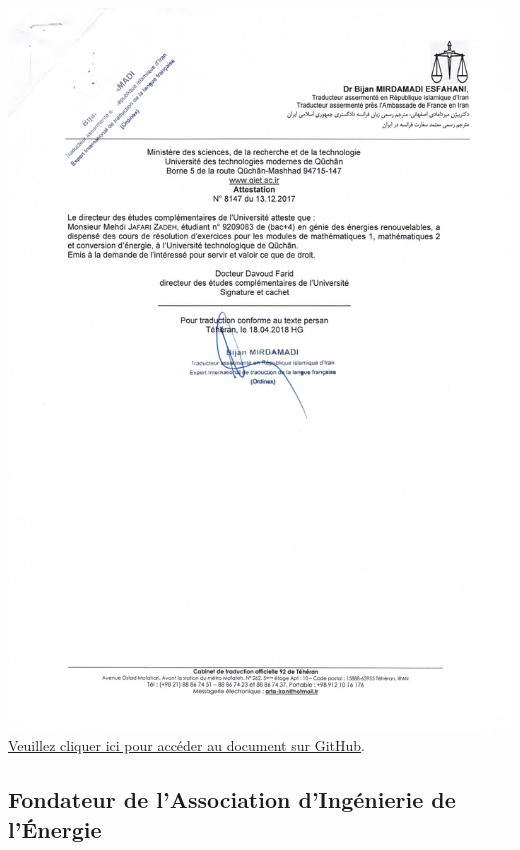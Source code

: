 \documentclass{article}
\begin{document}
        \begin{center}
            \includegraphics[width=\textwidth,height=\textheight,keepaspectratio]{../Document/Work Experience/Teaching Assistant/13-12-2017 attestation.jpg}
            \footnotesize
             \href{https://github.com/jafarizadeh/CV---lettre/tree/079f60796b41475881d7ba4a70abc3254d3dd466/Document/Work%20Experience/Teaching%20Assistant}{Veuillez cliquer ici pour accéder au document sur GitHub}.
        \end{center}
    
    \subsection{Fondateur de l'Association d'Ingénierie de l'Énergie}
\end{document}
